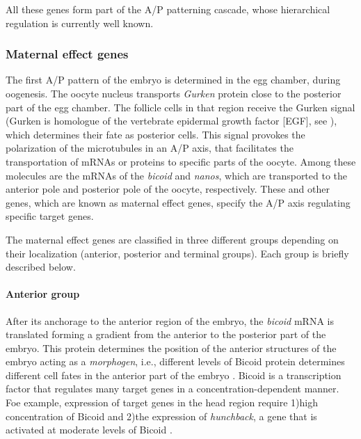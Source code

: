 All these genes form part of the A/P patterning cascade, whose hierarchical regulation is currently well known.

\subsubsection{Maternal effect genes}
The first A/P pattern of the embryo is determined in the egg chamber, during oogenesis.
The oocyte nucleus transports \textit{Gurken} protein close to the posterior part of the egg chamber. 
The follicle cells in that region receive the Gurken signal (Gurken is homologue of the vertebrate epidermal growth factor [EGF], see \citealp{Neuman-Silberberg1993}), which determines their fate as posterior cells.
This signal provokes the polarization of the microtubules in an A/P axis, that facilitates the transportation of mRNAs or proteins to specific parts of the oocyte.
Among these molecules are the mRNAs of the \textit{bicoid} and \textit{nanos}, which are transported to the anterior pole and posterior pole of the oocyte, respectively.
These and other genes, which are known as maternal effect genes, specify the A/P axis regulating specific target genes.

The maternal effect genes are classified in three different groups depending on their localization (anterior, posterior and terminal groups). Each group is briefly described below.

\paragraph{Anterior group}
After its anchorage to the anterior region of the embryo, the \textit{bicoid} mRNA is translated forming a gradient from the anterior to the posterior part of the embryo.
This protein determines the position of the anterior structures of the embryo acting as a \textit{morphogen}, i.e., different levels of Bicoid protein determines different cell fates in the anterior part of the embryo \citep{Driever1988}.
Bicoid is a transcription factor that regulates many target genes in a concentration-dependent manner. Foe example, expression of target genes in the head region require 1)high concentration of Bicoid and 2)the expression of \textit{hunchback}, a gene that is activated at moderate levels of Bicoid \citep{Simpson-Brose1994}.  

